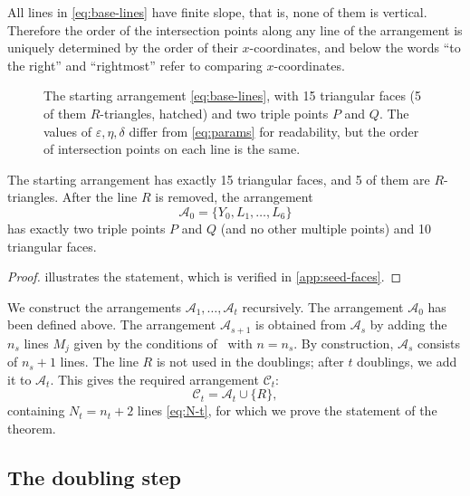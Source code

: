All lines in \eqref{eq:base-lines} have finite slope, that is, none of them is vertical.
Therefore the order of the intersection points along any line of the arrangement is uniquely determined by the order of their $x$-coordinates, and below the words ``to the right'' and ``rightmost'' refer to comparing $x$-coordinates.

\begin{figure}[t]
\centering
\resizebox{\ifdim\width>\linewidth\linewidth\else\width\fi}{!}{}
\caption{The starting arrangement \eqref{eq:base-lines}, with 15 triangular faces (5 of them $R$-triangles, hatched) and two triple points $P$ and $Q$. The values of $\varepsilon,\eta,\delta$ differ from \eqref{eq:params} for readability, but the order of intersection points on each line is the same.}
\label{fig:seed}
\end{figure}

\begin{lemma}\label{lem:seed}
The starting arrangement has exactly 15 triangular faces, and 5 of them are $R$-triangles.
After the line $R$ is removed, the arrangement
\[
\mathcal A_0=\{Y_0,L_1,\ldots,L_6\}
\]
has exactly two triple points $P$ and $Q$ (and no other multiple points) and 10 triangular faces.
\end{lemma}

\begin{proof}
 illustrates the statement, which is verified in \cref{app:seed-faces}.
\end{proof}

We construct the arrangements $\mathcal A_1,\ldots,\mathcal A_t$ recursively. The arrangement $\mathcal A_0$ has been defined above.
The arrangement $\mathcal A_{s+1}$ is obtained from $\mathcal A_s$ by adding the $n_s$ lines $M_j$ given by the conditions of~\cite[Prop.~3.1]{bbl} with $n=n_s$.
By construction, $\mathcal A_s$ consists of $n_s+1$ lines.
The line $R$ is not used in the doublings; after $t$ doublings, we add it to $\mathcal A_t$. This gives the required arrangement $\mathcal C_t$:
\[
\mathcal C_t=\mathcal A_t\cup\{R\},
\]
containing $N_t=n_t+2$ lines \eqref{eq:N-t}, for which we prove the statement of the theorem.

\subsection{The doubling step}

